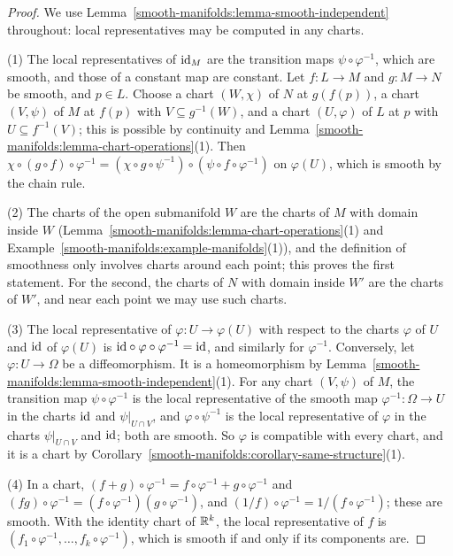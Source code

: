 \begin{proof}
We use Lemma~\ref{smooth-manifolds:lemma-smooth-independent} throughout: local representatives may be computed in any charts.

(1) The local representatives of $\mathrm{id}_M$ are the transition maps $\psi \circ \varphi^{-1}$, which are smooth, and those of a constant map are constant. Let
$f \colon L \to M$ and $g \colon M \to N$ be smooth, and $p \in L$. Choose a chart $(W, \chi)$ of $N$ at $g(f(p))$, a chart $(V, \psi)$ of $M$ at $f(p)$
with $V \subseteq g^{-1}(W)$, and a chart $(U, \varphi)$ of $L$ at $p$ with $U \subseteq f^{-1}(V)$; this is possible by continuity and
Lemma~\ref{smooth-manifolds:lemma-chart-operations}(1). Then $\chi \circ (g \circ f) \circ \varphi^{-1} = (\chi \circ g \circ \psi^{-1}) \circ
(\psi \circ f \circ \varphi^{-1})$ on $\varphi(U)$, which is smooth by the chain rule.

(2) The charts of the open submanifold $W$ are the charts of $M$ with domain inside $W$ (Lemma~\ref{smooth-manifolds:lemma-chart-operations}(1) and
Example~\ref{smooth-manifolds:example-manifolds}(1)), and the definition of smoothness only involves charts around each point; this proves the first
statement. For the second, the charts of $N$ with domain inside $W'$ are the charts of $W'$, and near each point we may use such charts.

(3) The local representative of $\varphi \colon U \to \varphi(U)$ with respect to the charts $\varphi$ of $U$ and $\mathrm{id}$ of $\varphi(U)$ is
$\mathrm{id} \circ \varphi \circ \varphi^{-1} = \mathrm{id}$, and similarly for $\varphi^{-1}$. Conversely, let $\varphi \colon U \to \Omega$ be a diffeomorphism. It is a
homeomorphism by Lemma~\ref{smooth-manifolds:lemma-smooth-independent}(1). For any chart $(V, \psi)$ of $M$, the transition map $\psi \circ \varphi^{-1}$ is the
local representative of the smooth map $\varphi^{-1} \colon \Omega \to U$ in the charts $\mathrm{id}$ and $\psi|_{U \cap V}$, and $\varphi \circ \psi^{-1}$ is the
local representative of $\varphi$ in the charts $\psi|_{U \cap V}$ and $\mathrm{id}$; both are smooth. So $\varphi$ is compatible with every chart, and it is a chart
by Corollary~\ref{smooth-manifolds:corollary-same-structure}(1).

(4) In a chart, $(f + g) \circ \varphi^{-1} = f \circ \varphi^{-1} + g \circ \varphi^{-1}$ and $(fg) \circ \varphi^{-1} = (f \circ \varphi^{-1})(g \circ \varphi^{-1})$,
and $(1/f) \circ \varphi^{-1} = 1/(f \circ \varphi^{-1})$; these are smooth. With the identity chart of $\mathbb{R}^k$, the local representative of $f$ is
$(f_1 \circ \varphi^{-1}, \ldots, f_k \circ \varphi^{-1})$, which is smooth if and only if its components are.


\end{proof}

